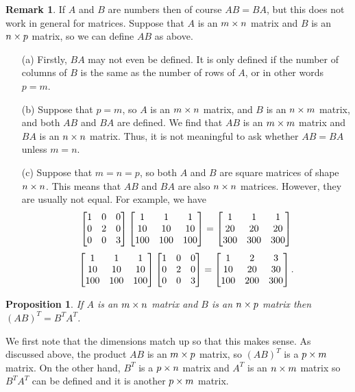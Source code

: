 \documentclass[reqno]{amsart}
\newtheorem{proposition}[theorem]{Proposition}
\theoremstyle{definition}
\newtheorem{remark}[theorem]{Remark}
\begin{document}
\begin{remark}\label{rem-not-commutative}
 If $A$ and $B$ are numbers then of course $AB=BA$, but this does not
 work in general for matrices.  Suppose that $A$ is an $m\times n$ matrix
 and $B$ is an $n\times p$ matrix, so we can define $AB$ as above.
 \begin{itemize}
  \item[(a)] Firstly, $BA$ may not even be defined.  It is only
   defined if the number of columns of $B$ is the same as the number
   of rows of $A$, or in other words $p=m$.
  \item[(b)] Suppose that $p=m$, so $A$ is an $m\times n$ matrix, and $B$
   is an $n\times m$ matrix, and both $AB$ and $BA$ are defined.  We find
   that $AB$ is an $m\times m$ matrix and $BA$ is an $n\times n$ matrix.
   Thus, it is not meaningful to ask whether $AB=BA$ unless $m=n$.
  \item[(c)] Suppose that $m=n=p$, so both $A$ and $B$ are square
   matrices of shape $n\times n$.  This means that $AB$ and $BA$ are also
   $n\times n$ matrices.  However, they are usually not equal.  For
   example, we have
   \[
     \left[\begin{matrix} 1 & 0 & 0 \\ 0 & 2 & 0 \\ 0 & 0 & 3 \end{matrix}\right]
     \left[\begin{matrix} 1 & 1 & 1 \\ 10 & 10 & 10 \\ 100 & 100 & 100 \end{matrix}\right] =
     \left[\begin{matrix} 1 & 1 & 1 \\ 20 & 20 & 20 \\ 300 & 300 & 300 \end{matrix}\right]
   \] \[
     \left[\begin{matrix} 1 & 1 & 1 \\ 10 & 10 & 10 \\ 100 & 100 & 100 \end{matrix}\right] 
     \left[\begin{matrix} 1 & 0 & 0 \\ 0 & 2 & 0 \\ 0 & 0 & 3 \end{matrix}\right] =
     \left[\begin{matrix} 1 & 2 & 3 \\ 10 & 20 & 30 \\ 100 & 200 & 300 \end{matrix}\right].
   \]
 \end{itemize}
\end{remark}

\begin{proposition}\label{prop-transpose-anti}
 If $A$ is an $m\times n$ matrix and $B$ is an $n\times p$ matrix then
 $(AB)^T=B^TA^T$.
\end{proposition}

We first note that the dimensions match up so that this makes sense.
As discussed above, the product $AB$ is an $m\times p$ matrix, so
$(AB)^T$ is a $p\times m$ matrix.  On the other hand, $B^T$ is a $p\times n$
matrix and $A^T$ is an $n\times m$ matrix so $B^TA^T$ can be defined and
it is another $p\times m$ matrix.
\end{document}
